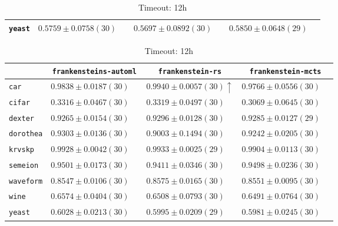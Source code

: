 \begin{table}[ht]
\begin{subtable}{\textwidth}
\begin{tabular}{l|ccc}
            \texttt{yeast} & $ 0.5759 \pm 0.0758 (30) \phantom{\downarrow}$ & $ 0.5697 \pm 0.0892 (30) \phantom{\downarrow}$ & $ \boldsymbol{0.5850} \pm 0.0648 (29) \phantom{\downarrow}$\\
            \hline
        \end{tabular}
    \end{subtable}
    \par\bigskip
    \begin{subtable}{\textwidth}
        \centering
        \caption{Timeout: 12h}
        \begin{tabular}{l|ccc}
            & \texttt{frankensteins-automl}  & \texttt{frankenstein-rs}  & \texttt{frankenstein-mcts} \\
            \hline
            \texttt{car} & $ 0.9838 \pm 0.0187 (30) \phantom{\downarrow}$ & $ \boldsymbol{0.9940} \pm 0.0057 (30) \uparrow$ & $ 0.9766 \pm 0.0556 (30) \phantom{\downarrow}$\\
            \texttt{cifar} & $ 0.3316 \pm 0.0467 (30) \phantom{\downarrow}$ & $ \boldsymbol{0.3319} \pm 0.0497 (30) \phantom{\downarrow}$ & $ 0.3069 \pm 0.0645 (30) \phantom{\downarrow}$\\
            \texttt{dexter} & $ 0.9265 \pm 0.0154 (30) \phantom{\downarrow}$ & $ \boldsymbol{0.9296} \pm 0.0128 (30) \phantom{\downarrow}$ & $ 0.9285 \pm 0.0127 (29) \phantom{\downarrow}$\\
            \texttt{dorothea} & $ \boldsymbol{0.9303} \pm 0.0136 (30) \phantom{\downarrow}$ & $ 0.9003 \pm 0.1494 (30) \phantom{\downarrow}$ & $ 0.9242 \pm 0.0205 (30) \phantom{\downarrow}$\\
            \texttt{krvskp} & $ 0.9928 \pm 0.0042 (30) \phantom{\downarrow}$ & $ \boldsymbol{0.9933} \pm 0.0025 (29) \phantom{\downarrow}$ & $ 0.9904 \pm 0.0113 (30) \phantom{\downarrow}$\\
            \texttt{semeion} & $ \boldsymbol{0.9501} \pm 0.0173 (30) \phantom{\downarrow}$ & $ 0.9411 \pm 0.0346 (30) \phantom{\downarrow}$ & $ 0.9498 \pm 0.0236 (30) \phantom{\downarrow}$\\
            \texttt{waveform} & $ 0.8547 \pm 0.0106 (30) \phantom{\downarrow}$ & $ \boldsymbol{0.8575} \pm 0.0165 (30) \phantom{\downarrow}$ & $ 0.8551 \pm 0.0095 (30) \phantom{\downarrow}$\\
            \texttt{wine} & $ \boldsymbol{0.6574} \pm 0.0404 (30) \phantom{\downarrow}$ & $ 0.6508 \pm 0.0793 (30) \phantom{\downarrow}$ & $ 0.6491 \pm 0.0764 (30) \phantom{\downarrow}$\\
            \texttt{yeast} & $ \boldsymbol{0.6028} \pm 0.0213 (30) \phantom{\downarrow}$ & $ 0.5995 \pm 0.0209 (29) \phantom{\downarrow}$ & $ 0.5981 \pm 0.0245 (30) \phantom{\downarrow}$\\
            \hline
        \end{tabular}
    \end{subtable}
\end{table}

